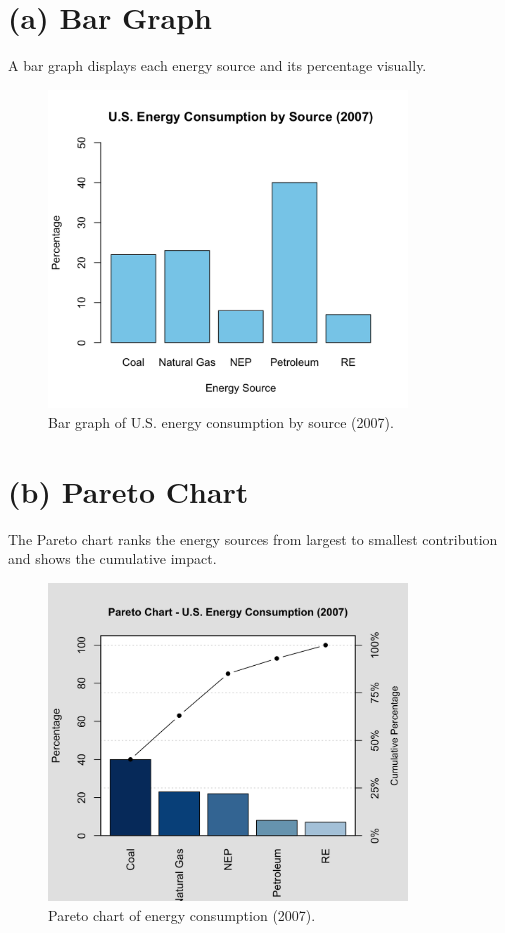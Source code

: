 \documentclass[12pt]{article}
\begin{document}
\section*{(a) Bar Graph}
A bar graph displays each energy source and its percentage visually.

\begin{figure}[H]
\centering
\includegraphics[width=0.85\textwidth]{1.4.3_bar_graph.png}
\caption{Bar graph of U.S. energy consumption by source (2007).}
\end{figure}

\section*{(b) Pareto Chart}
The Pareto chart ranks the energy sources from largest to smallest contribution and shows the cumulative impact.

\begin{figure}[H]
\centering
\includegraphics[width=0.85\textwidth]{1.4.3_b_pareto_chart.png}
\caption{Pareto chart of energy consumption (2007).}
\end{figure}
\end{document}

